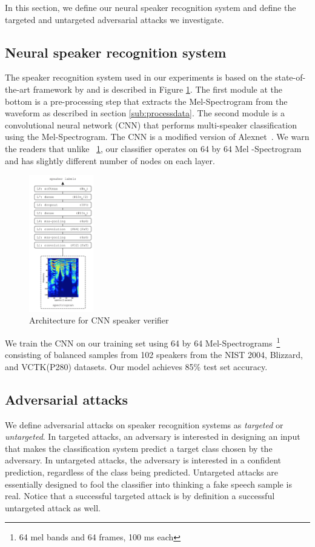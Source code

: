 In this section, we define our neural speaker recognition system and define the targeted and untargeted adversarial attacks we investigate.

\subsection{Neural speaker recognition system}
\label{sub:speaker_recognition}
The speaker recognition system used in our experiments is based on the state-of-the-art framework by \cite{lukic2016speaker} and is described in Figure \ref{fig:CNN}. The first module at the bottom is a pre-processing step that extracts the Mel-Spectrogram from the waveform as described in section \ref{sub:processdata}. The second module is a convolutional neural network (CNN) that performs multi-speaker classification using the Mel-Spectrogram. The CNN is a modified version of Alexnet~\cite{krizhevsky2012imagenet}. We warn the readers that unlike ~\ref{fig:CNN}, our classifier operates on 64 by 64 Mel -Spectrogram and has slightly different number of nodes on each layer.

\begin{figure}[h]
    \centering
    \includegraphics[width=0.25\textwidth]{./fig/cnn.png}
    \caption{Architecture for CNN speaker verifier}
    \label{fig:CNN}
\end{figure}

We train the CNN on our training set using 64 by 64 Mel-Spectrograms~\footnote{64 mel bands and 64 frames, 100 ms each} consisting of balanced samples from 102 speakers from the NIST 2004, Blizzard, and VCTK(P280) datasets. Our model achieves 85\% test set accuracy.

\subsection{Adversarial attacks}
We define adversarial attacks on speaker recognition systems as \textit{targeted} or \textit{untargeted}. In
targeted attacks, an adversary is interested in designing an input
that makes the classification system predict a target class chosen by the
adversary. In untargeted attacks, the adversary is interested in a confident
prediction, regardless of the class being predicted. Untargeted attacks are essentially designed to fool the classifier into thinking a fake speech sample is real. Notice that a successful targeted attack is by definition a successful untargeted attack as well.